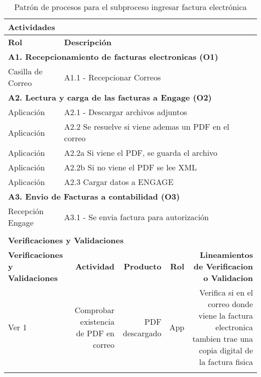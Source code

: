\begin{longtable}{|llrrrrrr|}
	
	\multicolumn{8}{|l|}{\textbf{Actividades}} \\ \hline
    \textbf{Rol} & \multicolumn{7}{|l|}{\textbf{Descripción}} \\ \hline 
    \multicolumn{8}{|l|}{\textbf{A1. Recepcionamiento de facturas electronicas (O1) }} \\ \hline
     Casilla de Correo& \multicolumn{7}{|l|}{A1.1 -  Recepcionar Correos} \\ \hline
   
    \multicolumn{8}{|l|}{\textbf{A2. Lectura y carga de las facturas a Engage (O2)}} \\ \hline
    Aplicación & \multicolumn{7}{|m{12cm}|}{A2.1 - Descargar archivos adjuntos} \\ \hline
    Aplicación & \multicolumn{7}{|l|}{A2.2 Se resuelve si viene ademas un PDF en el correo} \\ \hline
    Aplicación & \multicolumn{7}{|l|}{A2.2a Si viene el PDF, se guarda el archivo} \\ \hline
    Aplicación & \multicolumn{7}{|m{12cm}|}{A2.2b Si no viene el PDF se lee XML } \\ \hline
    Aplicación & \multicolumn{7}{|m{12cm}|}{A2.3 Cargar datos a ENGAGE} \\ \hline

    \multicolumn{8}{|l|}{\textbf{A3. Envio de Facturas a contabilidad (O3)}} \\ \hline
   	Recepción Engage & \multicolumn{7}{|l|}{A3.1 - Se envia factura para autorización} \\ \hline
    
     & & & & & & & \\ \hline
	\multicolumn{8}{|l|}{\textbf{Verificaciones y Validaciones}} \\ \hline
	\multicolumn{2}{|m{3cm}|}{\textbf{Verificaciones y Validaciones}} & \multicolumn{1}{m{2cm}|}{\textbf{Actividad}} & \multicolumn{1}{m{2,2cm}|}{\textbf{Producto}} & \multicolumn{1}{m{1.5cm}|}{\textbf{Rol}} &\multicolumn{3}{m{4cm}|}{\textbf{Lineamientos de Verificacion o Validacion}} \\ \hline
	
	\multicolumn{2}{|m{3cm}|}{Ver 1} & \multicolumn{1}{m{2cm}|}{Comprobar existencia de PDF en correo} & \multicolumn{1}{m{2,2cm}|}{PDF descargado} & \multicolumn{1}{m{1.5cm}|}{App} &\multicolumn{3}{m{4cm}|}{Verifica si en el correo donde viene la factura electronica tambien trae una copia digital de la factura fisica} \\ \hline
	
    \caption{Patrón de procesos para el subproceso ingresar factura electrónica}
\end{longtable}
